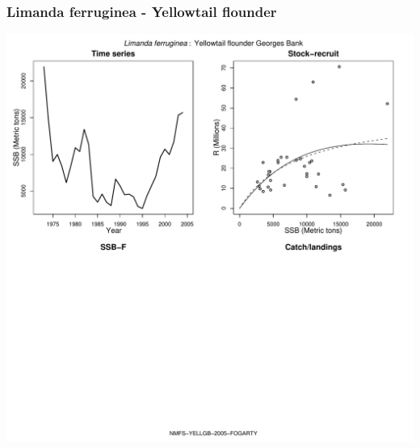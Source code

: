 \subsubsection{Limanda ferruginea - Yellowtail flounder}
\begin{center}
\includegraphics[width=1.2\textwidth]{../R/figures/NMFS-YELLGB-2005-FOGARTY.pdf}
\end{center}

